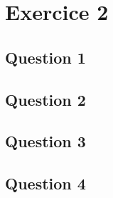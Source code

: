 \section{Exercice 2}
\subsection{Question 1}
\subsection{Question 2}
\subsection{Question 3}
\subsection{Question 4}
